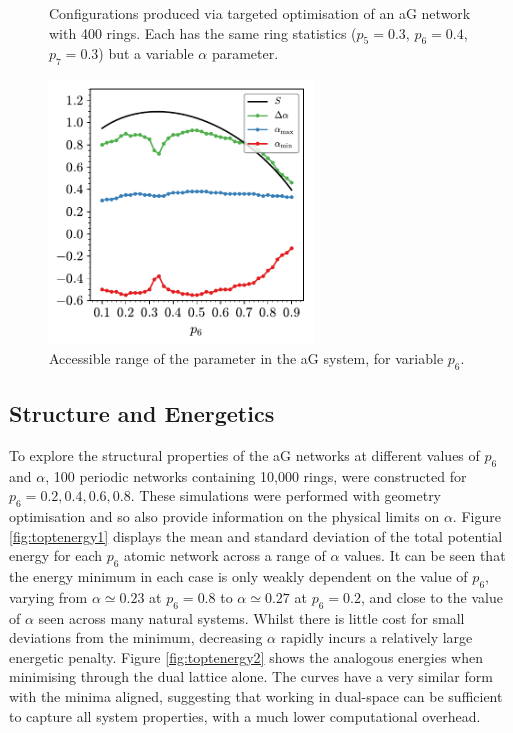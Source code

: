\begin{figure}[bt]
     \caption{Configurations produced via targeted optimisation of an aG network with 400 rings. Each has the same ring statistics ($p_5=0.3$, $p_6=0.4$, $p_7=0.3$) but a variable $\alpha$ parameter.}
     \label{fig:toptconfigs}
\end{figure}

\begin{figure}[bt]
	\centering
	\includegraphics[width=7cm]{./figures/targeted_opt/topt_alpha_limits.pdf}
	\caption{Accessible range of the \aw{} parameter in the aG system, for variable $p_6$.}
	\label{fig:alphalim}
\end{figure}


\subsection{Structure and Energetics}

To explore the structural properties of the aG networks at different values of $p_6$ and $\alpha$, 100 periodic networks containing 10,000 rings, were constructed for $p_6=0.2,0.4,0.6,0.8$. 
These simulations were performed with geometry optimisation and so also provide information on the physical limits on $\alpha$.
Figure \ref{fig:toptenergy1} displays the mean and standard deviation of the total potential energy for each $p_6$ atomic network across a range of $\alpha$ values. 
It can be seen that the energy minimum in each case is only weakly dependent on the value of $p_6$, varying from $\alpha\simeq{0.23}$ at $p_6=0.8$ to $\alpha\simeq{0.27}$ at $p_6=0.2$, and close to the value of $\alpha$ seen across many natural systems. 
Whilst there is little cost for small deviations from the minimum, decreasing $\alpha$ rapidly incurs a relatively large energetic penalty. 
Figure \ref{fig:toptenergy2} shows the analogous energies when minimising through the dual lattice alone. 
The curves have a very similar form with the minima aligned, suggesting that working in dual\--space can be sufficient to capture all system properties, with a much lower computational overhead.

